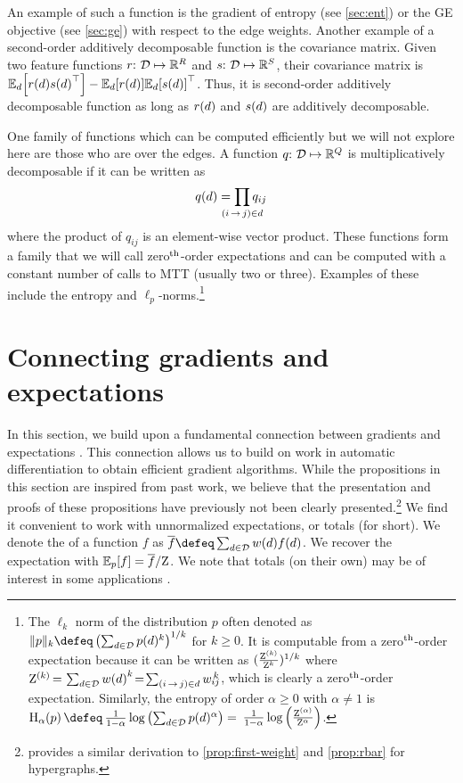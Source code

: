 \documentclass[11pt,a4paper]{article}
\theoremstyle{definition}
\begin{document}
An example of such a function is the gradient of entropy (see \cref{sec:ent}) or the GE objective \citep{mccallum2007generalized} (see \cref{sec:ge})
with respect to the edge weights.
Another example of a second-order additively decomposable function is the covariance matrix.
Given two feature functions $r{:}\,\,{\mathcal{D}} \mapsto \mathbb{R}^{{R}}$ and $s{:}\,\,{\mathcal{D}} \mapsto \mathbb{R}^{{S}}$,
their covariance matrix 
is ${\mathbb{E}_{{d}}\!\left[ {{r({d})}{s({d})}^\top} \right]} - {\mathbb{E}_{{d}}\!\left[ {{r({d})}} \right]}{\mathbb{E}_{{d}}\!\left[ {{s({d})}} \right]}^\top$.  Thus, it is second-order additively decomposable function as long as ${r(d)}$ and ${s(d)}$ are additively decomposable.

One family of functions which can be computed efficiently but we will not explore here are those who are  over the edges.
A function $q{:}\,\,{\mathcal{D}} \mapsto \mathbb{R}^{{Q}}$ is multiplicatively decomposable if it can be written as
\begin{equation}
    \treefunc{q}{\tree} = \smashoperator{\prod_{\edgeij\in\tree}}\edgefunc{q}{ij}
\end{equation}
where the product of $q_{ij}$ is an element-wise vector product.
These functions form a family that we will call zero$^{\text{th}}$-order expectations and can be computed with a constant number of calls to MTT (usually two or three).
Examples of these include the \renyi entropy and $\ell_p$-norms.\footnote{
The $\ell_k$ norm of the distribution $p$
often denoted as
$\| p \|_k \defeq \left( \sum_{\tree\in\st}p(\tree)^{k} \right)^{1/k}$ for $k\!\ge\!0$.  
It is computable from a zero$^{\text{th}}$-order expectation 
because it can be written as
$(\frac{{\mathrm{Z}}^{(k)}}{{\mathrm{Z}}^{k}})^{1/k}$ 
where ${\mathrm{Z}}^{(k)} \,{=}\, \sum_{{d} \in {\mathcal{D}}}{w({d})}^{k}
\!=\! \sum_{{(i\,{\rightarrow}\,j)}\in {d}}{w_{ij}}^{\!\!\!\!k}$, 
which is clearly a zero$^{\text{th}}$-order expectation.
Similarly, the \renyi entropy of order $\alpha\!\ge\!0$ with $\alpha \!\ne\! 1$ is
$\ent_\alpha(p)\,{\defeq}\, \frac{1}{1-\alpha}\log\left(\sum_{\tree\in\st}p(\tree)^{\alpha}\right) =$ 
$\frac{1}{1-\alpha}\log\left(\frac{{\mathrm{Z}}^{(\alpha)}}{{\mathrm{Z}}^{\alpha}}\right)$.
}

\section{Connecting gradients and expectations}\label{sec:connections}
In this section, we build upon a fundamental connection between gradients and expectations \citep{darwiche,li-eisner-2009}.
This connection allows us to build on work in automatic differentiation to obtain efficient gradient algorithms.
While the propositions in this section are inspired from past work, we believe that the presentation and proofs of these propositions have previously not been clearly presented.\footnote{\citet[Section 5.1]{li-eisner-2009} provides a similar derivation to \cref{prop:first-weight} and \cref{prop:rbar} for hypergraphs.}
We find it convenient to work with unnormalized expectations, or totals (for short).
We denote the  of a function $f$ as $\total{f} \defeq \sumtree \wtree{\tree} \treefunc{f}{\tree}$. 
We recover the expectation with ${\mathbb{E}_{p}\!\left[ {f} \right]} = {\overline{f}} / {\mathrm{Z}}$.
We note that totals (on their own) may be of interest in some applications \citep[Section 5.3]{vieira-eisner-2017-learning}.
\end{document}
